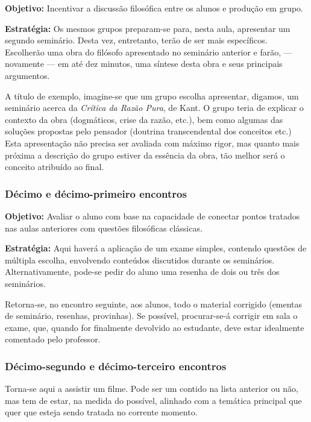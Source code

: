 \documentclass[12pt,a4paper]{article}
\begin{document}
	\textbf{Objetivo:} Incentivar a discussão filosófica entre 
	os alunos e produção em grupo. 

	\textbf{Estratégia:}
	Os mesmos grupos preparam-se para, nesta aula, apresentar um 
	segundo seminário. Desta vez, entretanto, terão de ser mais 
	específicos. Escolherão uma obra do filósofo apresentado no 
	seminário anterior e farão, --- novamente --- em até dez minutos, 
	uma síntese desta obra e seus principais argumentos. 
	
	A título de exemplo, imagine-se que um grupo escolha apresentar, 
	digamos, um seminário acerca da \textit{Crítica da Razão Pura}, 
	de Kant. O grupo teria de explicar o contexto da obra (dogmáticos, 
	crise da razão, etc.), bem como algumas das soluções propostas 
	pelo pensador (doutrina transcendental dos conceitos etc.) Esta 
	apresentação não precisa ser avaliada com máximo rigor, mas quanto 
	mais próxima a descrição do grupo estiver da essência da obra, 
	tão melhor será o conceito atribuído ao final. 
	
	\subsubsection{Décimo e décimo-primeiro encontros}
	
	\textbf{Objetivo:} Avaliar o aluno com base na capacidade de 
	conectar pontos tratados nas aulas anteriores com questões 
	filosóficas clássicas. 

	\textbf{Estratégia:}
	Aqui haverá a aplicação de um exame simples, contendo questões 
	de múltipla escolha, envolvendo conteúdos discutidos durante os 
	seminários. Alternativamente, pode-se pedir do aluno uma resenha 
	de dois ou três dos seminários. 
	
	Retorna-se, no encontro seguinte, aos alunos, todo o material 
	corrigido (ementas de seminário, resenhas, provinhas). Se possível, 
	procurar-se-á corrigir em sala o exame, que, quando for finalmente 
	devolvido ao estudante, deve estar idealmente comentado 
	pelo professor. 
	
	\subsubsection{Décimo-segundo e décimo-terceiro encontros}
	
	Torna-se aqui a assistir um filme. Pode ser um contido na 
	lista anterior ou não, mas tem de estar, na medida do possível, 
	alinhado com a temática principal que quer que esteja sendo 
	tratada no corrente momento. 
	
\end{document}
